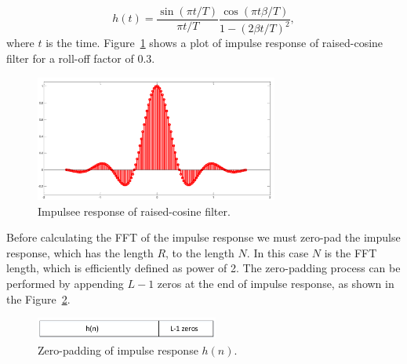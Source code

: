 \begin{equation}
    h(t)= \frac{\sin(\pi t/T)}{\pi t/T}\frac{\cos(\pi t \beta/T)}{1-(2\beta t/T)^2},
    \label{hn}
\end{equation}
where $t$ is the time. Figure~\ref{td_rc} shows a plot of impulse response of raised-cosine filter for a roll-off factor of 0.3.
\begin{figure}[h!]
    \centering
    \includegraphics[width=8cm]{./algorithms/overlap_save/figures/rc-td-filter-stemv2.pdf}
    \caption{Impulsee response of raised-cosine filter.}
    \label{td_rc}
\end{figure}
Before calculating the FFT of the impulse response we must zero-pad the impulse response, which has the length $R$, to the length $N$. In this case $N$ is the FFT length, which is efficiently defined as power of 2. The zero-padding process can be performed by appending $L-1$ zeros at the end of impulse response, as shown in the Figure~\ref{zp-hn}.

\begin{figure}[t!]
    \centering
    \includegraphics[width=6cm]{./algorithms/overlap_save/figures/zp-hn.pdf}
    \caption{Zero-padding of impulse response $h(n)$.}
    \label{zp-hn}
\end{figure}

